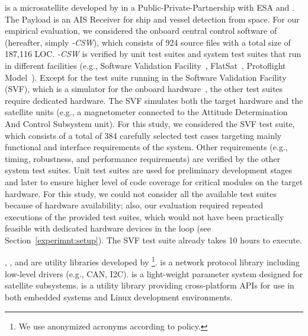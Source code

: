 \emph{\SAIL{}} is a microsatellite developed by \TWO{}  in a Public-Private-Partnership with ESA and \ExaE{}. The Payload is an AIS Receiver for ship and vessel detection from space. 
For our empirical evaluation, we considered the onboard central control software of \SAIL{} (hereafter, simply \SAIL{}\emph{-CSW}), which consists of 924 source files with a total size of 187,116 LOC. 
\SAIL{}\emph{-CSW} is verified by unit test suites and system test suites that run in different facilities (e.g., Software Validation Facility~\cite{Isasi2019}, FlatSat~\cite{Eickhoff:Simulate}, Protoflight Model~\cite{ecssHB10A}). 
Except for the test suite running in the Software Validation Facility (SVF), which is a simulator for the onboard hardware~\cite{Isasi2019}, the other test suites require dedicated hardware.
The SVF simulates both the target hardware and the satellite units (e.g., a magnetometer connected to the Attitude Determination And Control Subsystem unit).
For this study, we considered the SVF test suite, which
consists of a total of 384 carefully selected test cases targeting mainly functional and interface requirements of the system. 
Other requirements (e.g., timing, robustness, and performance requirements) are verified by the other system test suites.
Unit test suites are used for preliminary development stages and later to ensure 
higher level of code coverage for critical modules on the target hardware.
For this study, we could not consider all the available test suites because of hardware availability; also, our evaluation required repeated executions of the provided test suites, which would not have been practically feasible with dedicated hardware devices in the loop (see Section~\ref{experimnt:setup}).
The SVF test suite already takes 10 hours to execute.


\GCSP{}, \PARAM{}, and \UTIL{}  are utility libraries developed by \ONE\footnote{We use anonymized acronyms according to \ONE policy.}.
\emph{\GCSP{}} is a network protocol library including low-level drivers (e.g., CAN, I2C).
{\PARAM{}} is a light-weight parameter system designed for \ONE satellite subsystems. 
{\UTIL{}} is a utility library providing cross-platform APIs for use in both embedded systems and Linux development environments.

